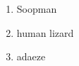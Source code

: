\documentclass{article}
\begin{document}
	
	\begin{enumerate}
		\item Soopman
		\item human lizard
		\item adaeze
	\end{enumerate}
\end{document}
